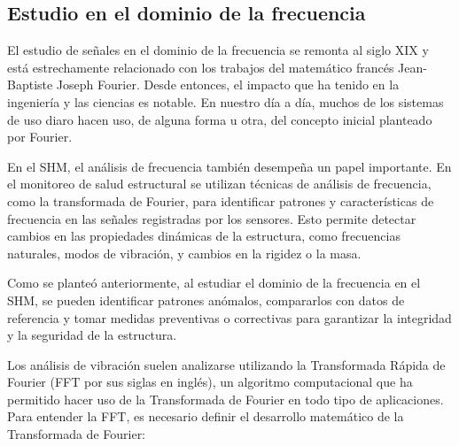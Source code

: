 \subsection{Estudio en el dominio de la frecuencia} El estudio de señales en el dominio de la frecuencia se remonta al siglo XIX y está estrechamente relacionado con los trabajos del matemático francés Jean-Baptiste Joseph Fourier. Desde entonces, el impacto que ha tenido en la ingeniería y las ciencias es notable. En nuestro día a día, muchos de los sistemas de uso diaro hacen uso, de alguna forma u otra, del concepto inicial planteado por Fourier. 

En el SHM, el análisis de frecuencia también desempeña un papel importante. En el monitoreo de salud estructural se utilizan técnicas de análisis de frecuencia, como la transformada de Fourier, para identificar patrones y características de frecuencia en las señales registradas por los sensores. Esto permite detectar cambios en las propiedades dinámicas de la estructura, como frecuencias naturales, modos de vibración, y cambios en la rigidez o la masa.

Como se planteó anteriormente, al estudiar el dominio de la frecuencia en el SHM, se pueden identificar patrones anómalos, compararlos con datos de referencia y tomar medidas preventivas o correctivas para garantizar la integridad y la seguridad de la estructura.

Los análisis de vibración suelen analizarse utilizando la Transformada Rápida de Fourier (FFT por sus siglas en inglés), un algoritmo computacional que ha permitido hacer uso de la Transformada de Fourier en todo tipo de aplicaciones. Para entender la FFT, es necesario definir el desarrollo matemático de la Transformada de Fourier:


